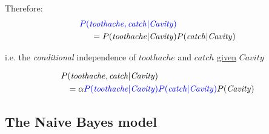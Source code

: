 \begin{frame}


Therefore:\slidesonly{\\ \vspace{-7mm}}
\begin{align}
{
\color{blue}
P(\mathit{toothache}
, \mathit{catch}
 | \mathit{Cavity}) 
} &\\
= P(\mathit{toothache}
| \mathit{Cavity}) &P(\mathit{catch}
| \mathit{Cavity})
\label{eq:condindep}
\end{align}

i.e. the \emph{conditional} independence of $\mathit{toothache}$ and $\mathit{catch}$ \underline{given} $\mathit{Cavity}$

\pause


\svspace{-4mm}

\begin{align}
P(\mathit{toothache}, \mathit{catch} | \mathit{Cavity}) &\\
= \alpha {\color{blue}P(\mathit{toothache}| \mathit{Cavity})} &
{\color{blue}P(\mathit{catch}| \mathit{Cavity})} P(\mathit{Cavity})
\end{align}

\end{frame}

\subsection{The Naive Bayes model}

